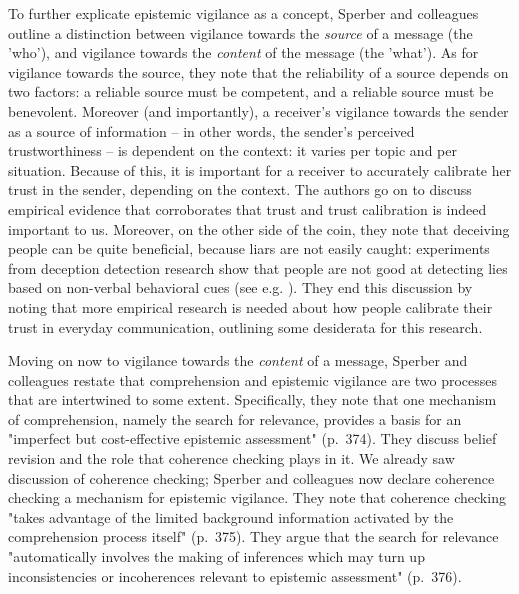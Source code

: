 To further explicate epistemic vigilance as a concept, Sperber and colleagues outline a distinction between vigilance towards the \emph{source} of a message (the 'who'), and vigilance towards the \emph{content} of the message (the 'what').
As for vigilance towards the source, they note that the reliability of a source depends on two factors: a reliable source must be competent, and a reliable source must be benevolent.
Moreover (and importantly), a receiver's vigilance towards the sender as a source of information -- in other words, the sender's perceived trustworthiness -- is dependent on the context: it varies per topic and per situation.
Because of this, it is important for a receiver to accurately calibrate her trust in the sender, depending on the context.
The authors go on to discuss empirical evidence that corroborates that trust and trust calibration is indeed important to us.
Moreover, on the other side of the coin, they note that deceiving people can be quite beneficial, because liars are not easily caught: experiments from deception detection research show that people are not good at detecting lies based on non-verbal behavioral cues (see e.g. \citet{Vrij00}).
They end this discussion by noting that more empirical research is needed about how people calibrate their trust in everyday communication, outlining some desiderata for this research.


Moving on now to vigilance towards the \emph{content} of a message, Sperber and colleagues restate that comprehension and epistemic vigilance are two processes that are intertwined to some extent. Specifically, they note that one mechanism of comprehension, namely the search for relevance, provides a basis for an "imperfect but cost-effective epistemic assessment" (p.~374).
They discuss belief revision and the role that coherence checking plays in it. We already saw  discussion of coherence checking; Sperber and colleagues now declare coherence checking a mechanism for epistemic vigilance. They note that coherence checking "takes advantage of the limited background information activated by the comprehension process itself" (p.~375). They argue that the search for relevance "automatically involves the making of inferences which may turn up inconsistencies or incoherences relevant to epistemic assessment" (p.~376).


